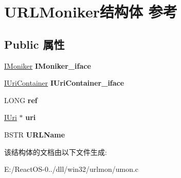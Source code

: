 \hypertarget{struct_u_r_l_moniker}{}\section{U\+R\+L\+Moniker结构体 参考}
\label{struct_u_r_l_moniker}
\subsection*{Public 属性}
\begin{DoxyCompactItemize}
\item 
\mbox{\label{struct_u_r_l_moniker_a33d0c6ed1c7d484bf7d7bfe300eb0198}} 
\hyperlink{interface_i_moniker}{I\+Moniker} {\bfseries I\+Moniker\+\_\+iface}
\item 
\mbox{\label{struct_u_r_l_moniker_a3d142761167e6a79a444546638e67afb}} 
\hyperlink{interface_i_uri_container}{I\+Uri\+Container} {\bfseries I\+Uri\+Container\+\_\+iface}
\item 
\mbox{\label{struct_u_r_l_moniker_a283ca991632c816ebb32cd32e96e5a73}} 
L\+O\+NG {\bfseries ref}
\item 
\mbox{\label{struct_u_r_l_moniker_afaf9f6f7aed9ff8171c7f38067d74268}} 
\hyperlink{interface_i_uri}{I\+Uri} $\ast$ {\bfseries uri}
\item 
\mbox{\label{struct_u_r_l_moniker_a40368099c538077e6e109701ee790c6f}} 
B\+S\+TR {\bfseries U\+R\+L\+Name}
\end{DoxyCompactItemize}


该结构体的文档由以下文件生成\+:\begin{DoxyCompactItemize}
\item 
E\+:/\+React\+O\+S-\/0../dll/win32/urlmon/umon.\+c\end{DoxyCompactItemize}
